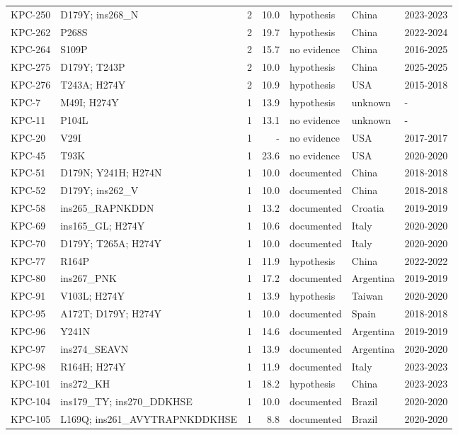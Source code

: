 \begin{longtable}{@{}l p{4.6cm} r r l l l@{}}
KPC-250 & D179Y; ins268\_N & 2 & 10.0 & hypothesis & China & 2023-2023 \\
KPC-262 & P268S & 2 & 19.7 & hypothesis & China & 2022-2024 \\
KPC-264 & S109P & 2 & 15.7 & no evidence & China & 2016-2025 \\
KPC-275 & D179Y; T243P & 2 & 10.0 & hypothesis & China & 2025-2025 \\
KPC-276 & T243A; H274Y & 2 & 10.9 & hypothesis & USA & 2015-2018 \\
KPC-7 & M49I; H274Y & 1 & 13.9 & hypothesis & unknown & - \\
KPC-11 & P104L & 1 & 13.1 & no evidence & unknown & - \\
KPC-20 & V29I & 1 & - & no evidence & USA & 2017-2017 \\
KPC-45 & T93K & 1 & 23.6 & no evidence & USA & 2020-2020 \\
KPC-51 & D179N; Y241H; H274N & 1 & 10.0 & documented & China & 2018-2018 \\
KPC-52 & D179Y; ins262\_V & 1 & 10.0 & documented & China & 2018-2018 \\
KPC-58 & ins265\_RAPNKDDN & 1 & 13.2 & documented & Croatia & 2019-2019 \\
KPC-69 & ins165\_GL; H274Y & 1 & 10.6 & documented & Italy & 2020-2020 \\
KPC-70 & D179Y; T265A; H274Y & 1 & 10.0 & documented & Italy & 2020-2020 \\
KPC-77 & R164P & 1 & 11.9 & hypothesis & China & 2022-2022 \\
KPC-80 & ins267\_PNK & 1 & 17.2 & documented & Argentina & 2019-2019 \\
KPC-91 & V103L; H274Y & 1 & 13.9 & hypothesis & Taiwan & 2020-2020 \\
KPC-95 & A172T; D179Y; H274Y & 1 & 10.0 & documented & Spain & 2018-2018 \\
KPC-96 & Y241N & 1 & 14.6 & documented & Argentina & 2019-2019 \\
KPC-97 & ins274\_SEAVN & 1 & 13.9 & documented & Argentina & 2020-2020 \\
KPC-98 & R164H; H274Y & 1 & 11.9 & documented & Italy & 2023-2023 \\
KPC-101 & ins272\_KH & 1 & 18.2 & hypothesis & China & 2023-2023 \\
KPC-104 & ins179\_TY; ins270\_DDKHSE & 1 & 10.0 & documented & Brazil & 2020-2020 \\
KPC-105 & L169Q; ins261\_AVYTRAPNKDDKHSE & 1 & 8.8 & documented & Brazil & 2020-2020 \\

\end{longtable}
